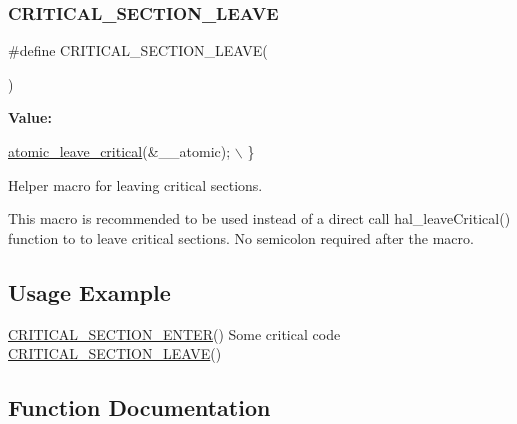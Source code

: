 \subsubsection{\texorpdfstring{C\+R\+I\+T\+I\+C\+A\+L\+\_\+\+S\+E\+C\+T\+I\+O\+N\+\_\+\+L\+E\+A\+VE}{CRITICAL\_SECTION\_LEAVE}}
{\footnotesize\ttfamily \#define C\+R\+I\+T\+I\+C\+A\+L\+\_\+\+S\+E\+C\+T\+I\+O\+N\+\_\+\+L\+E\+A\+VE(\begin{DoxyParamCaption}{ }\end{DoxyParamCaption})}

{\bfseries Value\+:}
\begin{DoxyCode}
\hyperlink{group__doc__driver__hal__helper__atomic_gaef0ccaa2438aca5ea074b36252d65990}{atomic\_leave\_critical}(&\_\_atomic);                                                     
                                   \(\backslash\)
    \}
\end{DoxyCode}


Helper macro for leaving critical sections. 

This macro is recommended to be used instead of a direct call hal\+\_\+leave\+Critical() function to to leave critical sections. No semicolon required after the macro.\hypertarget{group__doc__driver__hal__helper__atomic_atomic_usage}{}\subsection{Usage Example}\label{group__doc__driver__hal__helper__atomic_atomic_usage}

\begin{DoxyCode}
\hyperlink{group__doc__driver__hal__helper__atomic_ga039bfe712b6ba4388a35672f54763391}{CRITICAL\_SECTION\_ENTER}()
Some critical code
\hyperlink{group__doc__driver__hal__helper__atomic_ga6b32c9f95e7c6b604d621e215c514015}{CRITICAL\_SECTION\_LEAVE}()
\end{DoxyCode}
 

\subsection{Function Documentation}
\mbox{\label{group__doc__driver__hal__helper__atomic_ga3bd20e6e0bdec53177758490510ba916}} 
